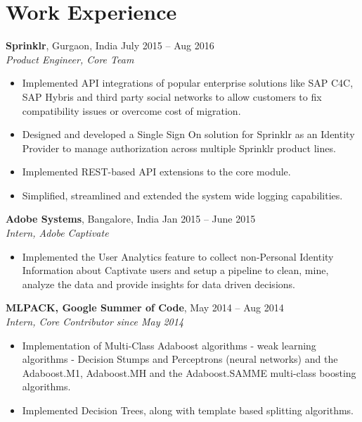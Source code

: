 \documentclass[letterpaper]{article}
\begin{document}
\section*{Work Experience}
\textbf{Sprinklr}, Gurgaon, India \hfill July 2015 -- Aug 2016\\
\emph{Product Engineer, Core Team}\\
\vspace{-6mm}
\begin{itemize}
\item Implemented API integrations of popular enterprise solutions like SAP C4C, SAP Hybris and third party social networks to allow customers to fix compatibility issues or overcome cost of migration. 
\vspace{-2mm}
\item Designed and developed a Single Sign On solution for Sprinklr as an Identity Provider to manage authorization across multiple Sprinklr product lines.
\vspace{-2mm}
\item Implemented REST-based API extensions to the core module.
\vspace{-2mm}
\item Simplified, streamlined and extended the system wide logging capabilities.
\end{itemize}

\vspace{-0.5mm}
\textbf{Adobe Systems}, Bangalore, India \hfill Jan 2015 -- June 2015\\
\emph{Intern, Adobe Captivate}\\
\vspace{-6mm}
\begin{itemize}
\item Implemented the User Analytics feature to collect non-Personal Identity Information about Captivate users and setup a pipeline to clean, mine, analyze the data and provide insights for data driven decisions.
\end{itemize}

\vspace{-0.5mm}
\textbf{MLPACK, Google Summer of Code}, \hfill May 2014 -- Aug 2014\\
\emph{Intern, Core Contributor since May 2014}\\
\vspace{-6mm}
\begin{itemize}
\item Implementation of Multi-Class Adaboost algorithms - weak learning algorithms - Decision Stumps and Perceptrons (neural networks) and the Adaboost.M1, Adaboost.MH and the Adaboost.SAMME multi-class boosting algorithms. \\
\vspace{-6mm}
\item Implemented Decision Trees, along with template based splitting algorithms.
\end{itemize}
\end{document}
